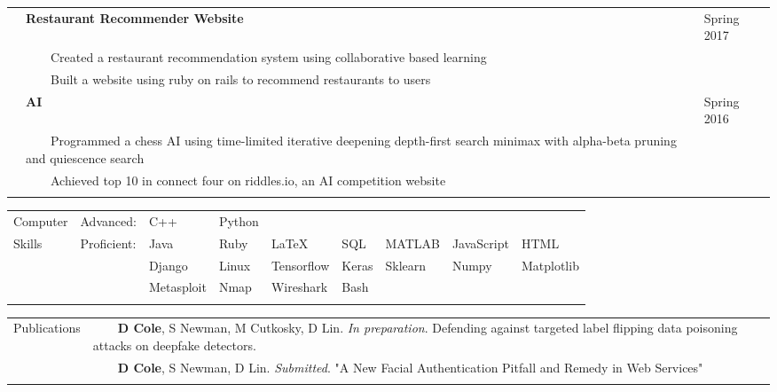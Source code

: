 \documentclass[10.5pt, arial]{article}
\newcommand{\tabitem}{~~\llap{\textbullet}~~}
\begin{document}
\begin{tabular}{p{1.5cm} p{13.2cm} l}
                & \textbf{Restaurant Recommender Website}                       & Spring 2017             \\
                & \tabitem Created a restaurant recommendation system using collaborative based learning    &   \\
                & \tabitem Built a website using ruby on rails to recommend restaurants to users            &   \\

                & \textbf{AI}                                             & Spring 2016   \\
                & \tabitem Programmed a chess AI using time-limited iterative deepening depth-first search minimax with alpha-beta pruning and quiescence search & \\
                & \tabitem Achieved top 10 in connect four on riddles.io, an AI competition website & \\ 
\\
\end{tabular}


\begin{tabular}{p{1.5cm} l l l l l l l l}
Computer	& Advanced: 	& C++ 		& Python 	& 			& 			& 			& 				&       \\
Skills		& Proficient:	& Java 		& Ruby 		& \LaTeX 	& SQL 		& MATLAB   	& JavaScript	& HTML  \\
			&			 	& Django 	& Linux 	& Tensorflow& Keras     & Sklearn	& Numpy	        & Matplotlib   \\
            &               & Metasploit& Nmap      & Wireshark & Bash      &           &               &       \\
\\
\end{tabular}


\begin{tabular}{p{1.5cm} p{16.5cm}}
    Publications    & \tabitem \textbf{D Cole}, S Newman, M Cutkosky, D Lin. \textit{In preparation}. Defending against targeted label flipping data poisoning attacks on deepfake detectors. \\
                    & \tabitem \textbf{D Cole}, S Newman, D Lin. \textit{Submitted}. "A New Facial Authentication Pitfall and Remedy in Web Services" \\ \\
\end{tabular}
\end{document}
